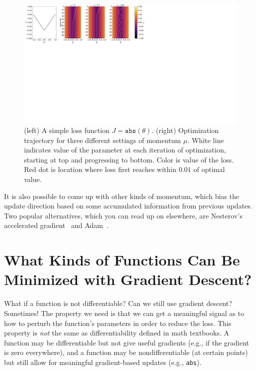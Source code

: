 \begin{figure}[h]
    \centering
    \includegraphics[width=1.0\linewidth]{./figures/gradient_descent/momentum_out1.pdf}
    \caption{(left) A simple loss function $J = \texttt{abs}(\theta)$. (right) Optimization trajectory for three different settings of momentum $\mu$. White line indicates value of the parameter at each iteration of optimization, starting at top and progressing to bottom. Color is value of the loss. Red dot is location where loss first reaches within $0.01$ of optimal value.}
    \label{fig:gradient_descent:momentum_out1}
\end{figure}

It is also possible to come up with other kinds of momentum, which bias the update direction based on some accumulated information from previous updates. Two popular alternatives, which you can read up on elsewhere, are Nesterov's accelerated gradient~\cite{nesterov1983method} and Adam~\cite{kingma2014adam}.


\section{What Kinds of Functions Can Be Minimized with Gradient Descent?}

What if a function is not differentiable? Can we still use gradient descent? Sometimes! The property we need is that we can get a meaningful signal as to how to perturb the function's parameters in order to reduce the loss. This property is \textit{not} the same as differentiability defined in math textbooks. A function may be differentiable but not give useful gradients (e.g., if the gradient is zero everywhere), and a function may be nondifferentiable (at certain points) but still allow for meaningful gradient-based updates (e.g., \texttt{abs}).

